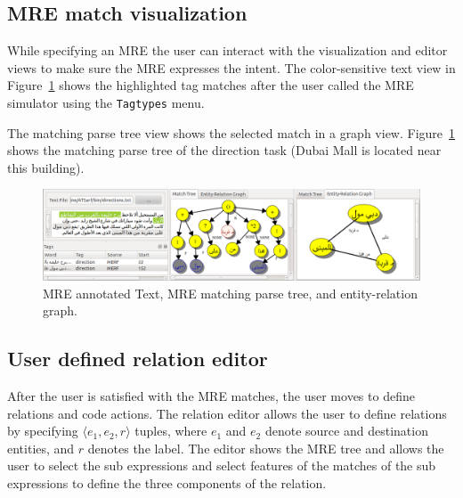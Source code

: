\vspace{-1em}
\subsection{MRE match visualization}

While specifying an MRE the user can interact with the visualization and editor views
to make sure the MRE expresses the intent. 
The color-sensitive text view in Figure~\ref{fig:treegraph} shows 
the highlighted tag matches after the user called the MRE simulator using 
the {\tt Tagtypes} menu. 

The matching parse tree view shows the selected match in a graph view.
Figure~\ref{fig:treegraph} shows the matching parse tree of the direction task 
(Dubai Mall is located near this building). 

\begin{figure}[tb]
  \centering
  \includegraphics[width=\textwidth]{figures/treegraph}
  \vspace{-2em}
  \caption{\label{fig:treegraph}MRE annotated Text, MRE matching parse tree, and entity-relation graph.}
\end{figure}


\subsection{User defined relation editor}

After the user is satisfied with the MRE matches, 
the user moves to define relations and code actions. 
The relation editor allows the user to define relations 
by specifying $\langle e_1,e_2,r\rangle$ tuples, 
where $e_1$ and $e_2$ denote source and destination entities, and $r$ denotes 
the label.
The editor shows the MRE tree and allows the user to select the sub 
expressions and select features 
of the matches of the sub expressions to define the three components of the relation. 

